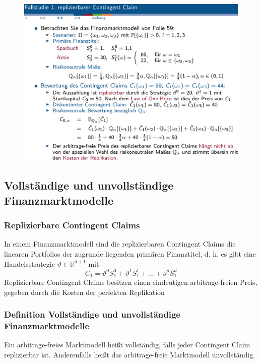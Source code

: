 \documentclass[12pt]{report}
\theoremstyle{dotless}
\theoremstyle{definition}
\begin{document}
\begin{figure}[ht]
	\centering
	\includegraphics[width=\textwidth]{Bilder/Contingent.png}
\end{figure}



\subsection{Vollständige und unvollständige Finanzmarktmodelle}


\subsubsection{Replizierbare Contingent Claims}
In einem Finanzmarktmodell sind die replizierbaren Contingent Claims die
linearen Portfolios der zugrunde liegenden primären Finanztitel, d. h. es gibt
eine Handelsstrategie $\vartheta \in \mathbb{R}^{d+1}$ mit
\begin{equation}
C_1=\vartheta^0S_1^0 + \vartheta^1S_1^1 + ...+ \vartheta^dS_1^d
\end{equation}
Replizierbare Contingent Claims besitzen einen eindeutigen arbitrage-freien
Preis, gegeben durch die Kosten der perfekten Replikation


\subsubsection{Definition Vollständige und unvollständige Finanzmarktmodelle}
Ein arbitrage-freies Marktmodell heißt vollständig, falls jeder Contingent Claim
replizierbar ist. Anderenfalls heißt das arbitrage-freie Marktmodell unvollständig.
\end{document}
